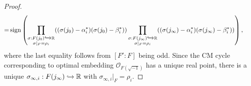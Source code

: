 \documentclass[10pt,a4paper]{amsart}
\DeclareMathOperator{\sgn}{sign}
\newcommand{\bR}{\mathbb{R}}
\newcommand{\cO}{\mathcal{O}}
\begin{document}
\begin{proof}
\begin{align*}
   =&\sgn\left(\prod_{\substack{\sigma: F(j_0)\xhookrightarrow{}\bR \\ \sigma|_{F} = \rho_i}}((\sigma(j_0) - \alpha_{i}^*)(\sigma(j_0)- \beta_i^*)) \prod_{\substack{\sigma: F(j_\infty)\xhookrightarrow{}\bR \\ \sigma|_{F} = \rho_i}}((\sigma(j_\infty) - \alpha_{i}^*)(\sigma(j_\infty)- \beta_i^*))\right),
\end{align*} where the last equality follows from $[F':F]$ being odd. 
Since the CM cycle corresponding to optimal embedding $\cO_{F(\sqrt{-1})}$ has a unique real point, there is a unique $\sigma_{\infty,i}: F(j_{\infty}) \xhookrightarrow{} \bR$ with $\sigma_{\infty,i}|_F = \rho_i$.
\end{proof} 
\end{document}
